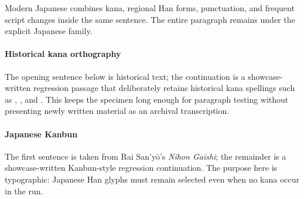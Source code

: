 Modern Japanese combines kana, regional Han forms, punctuation, and frequent
script changes inside the same sentence. The entire paragraph remains under
the explicit Japanese family.



\paragraph{Historical kana orthography}

The opening sentence below is historical text; the continuation is a
showcase-written regression passage that deliberately retains historical kana
spellings such as , , and . This keeps the
specimen long enough for paragraph testing without presenting newly written
material as an archival transcription.


\paragraph{Japanese Kanbun}

The first sentence is taken from Rai San'yō's \emph{Nihon Gaishi}; the
remainder is a showcase-written Kanbun-style regression continuation. The
purpose here is typographic: Japanese Han glyphs must remain selected even
when no kana occur in the run.



